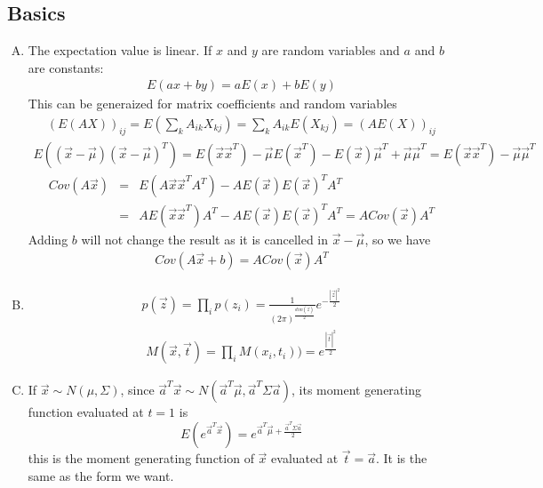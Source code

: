 \documentclass{article}
\begin{document}
\subsection{Basics}
\begin{enumerate}[(A)]

\item

The expectation value is linear. If $x$ and $y$ are random variables and $a$ and $b$ are constants:
\begin{eqnarray}
E(ax+by)=aE(x)+bE(y)
\end{eqnarray}
This can be generaized for matrix coefficients and random variables
\begin{eqnarray}
(E(AX))_{ij}=E(\sum_k A_{ik}X_{kj})=\sum_kA_{ik}E(X_{kj})=(AE(X))_{ij}
\end{eqnarray}
\begin{eqnarray}
E((\vec{x}-\vec{\mu})(\vec{x}-\vec{\mu})^T)=E(\vec{x}\vec{x}^T)-\vec{\mu}E(\vec{x}^T)-E(\vec{x})\vec{\mu}^T+\vec{\mu}\vec{\mu}^T=E(\vec{x}\vec{x}^T)-\vec{\mu}\vec{\mu}^T
\end{eqnarray}
\begin{eqnarray}
Cov(A\vec{x})&=&E(A\vec{x}\vec{x}^TA^T)-AE(\vec{x})E(\vec{x})^TA^T\nonumber\\
&=&AE(\vec{x}\vec{x}^T)A^T-AE(\vec{x})E(\vec{x})^TA^T=ACov(\vec{x})A^T
\end{eqnarray}
Adding $b$ will not change the result as it is cancelled in $\vec{x}-\vec{\mu}$, so we have
\begin{eqnarray}
Cov(A\vec{x}+b)=ACov(\vec{x})A^T
\end{eqnarray}

\item

\begin{eqnarray}
p(\vec{z})=\prod_ip(z_i)=\frac{1}{(2\pi)^{\frac{dim(\vec{z})}{2}}}e^{-\frac{|\vec{z}|^2}{2}}
\end{eqnarray}
\begin{eqnarray}
M(\vec{x},\vec{t})=\prod_iM(x_i,t_i))=e^{\frac{|\vec{t}|^2}{2}}
\end{eqnarray}

\item

If $\vec{x}\sim N(\mu,\Sigma)$, since $\vec{a}^T\vec{x}\sim N(\vec{a}^T\vec{\mu},\vec{a}^T\Sigma\vec{a})$, its moment generating function evaluated at $t=1$ is
\begin{equation}
E(e^{\vec{a}^T\vec{x}})=e^{\vec{a}^T\vec{\mu}+\frac{\vec{a}^T\Sigma\vec{a}}{2}}
\end{equation}
this is the moment generating function of $\vec{x}$ evaluated at $\vec{t}=\vec{a}$. It is the same as the form we want.


\end{enumerate}
\end{document}
